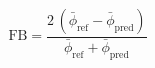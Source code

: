 \documentclass[12pt]{article}
\begin{document}
\begin{equation*}
\text{FB} = \frac{2\,(\bar{\phi}_{\text{ref}} - \bar{\phi}_{\text{pred}})}{\bar{\phi}_{\text{ref}} + \bar{\phi}_{\text{pred}}}
\end{equation*}
\end{document}
